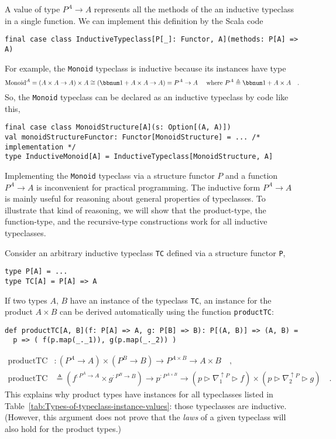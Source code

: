 A value of type $P^{A}\rightarrow A$ represents all the methods of
the an inductive typeclass in a single function. We can implement
this definition by the Scala code
\begin{lstlisting}
final case class InductiveTypeclass[P[_]: Functor, A](methods: P[A] => A)
\end{lstlisting}
For example, the \lstinline!Monoid! typeclass is inductive because
its instances have type 
\[
\text{Monoid}^{A}=\left(A\times A\rightarrow A\right)\times A\cong(\bbnum 1+A\times A\rightarrow A)=P^{A}\rightarrow A\quad\text{ where }P^{A}\triangleq\bbnum 1+A\times A\quad.
\]
So, the \lstinline!Monoid! typeclass can be declared as an inductive
typeclass by code like this,
\begin{lstlisting}
final case class MonoidStructure[A](s: Option[(A, A)])
val monoidStructureFunctor: Functor[MonoidStructure] = ... /* implementation */
type InductiveMonoid[A] = InductiveTypeclass[MonoidStructure, A]
\end{lstlisting}
Implementing the \lstinline!Monoid! typeclass via a structure functor
$P$ and a function $P^{A}\rightarrow A$ is inconvenient for practical
programming. The inductive form $P^{A}\rightarrow A$ is mainly useful
for reasoning about general properties of typeclasses. To illustrate
that kind of reasoning, we will show that the product-type, the function-type,
and the recursive-type constructions work for all inductive typeclasses. 

Consider an arbitrary inductive typeclass \lstinline!TC! defined
via a structure functor \lstinline!P!,
\begin{lstlisting}
type P[A] = ...
type TC[A] = P[A] => A
\end{lstlisting}
If two types $A$, $B$ have an instance of the typeclass \lstinline!TC!,
an instance for the product $A\times B$ can be derived automatically
using the function \lstinline!productTC!:
\begin{lstlisting}
def productTC[A, B](f: P[A] => A, g: P[B] => B): P[(A, B)] => (A, B) =
  p => ( f(p.map(_._1)), g(p.map(_._2)) )
\end{lstlisting}
\begin{align*}
\text{productTC} & :(P^{A}\rightarrow A)\times(P^{B}\rightarrow B)\rightarrow P^{A\times B}\rightarrow A\times B\quad,\\
\text{productTC} & \triangleq(f^{:P^{A}\rightarrow A}\times g^{:P^{B}\rightarrow B})\rightarrow p^{:P^{A\times B}}\rightarrow(p\triangleright\nabla_{1}^{\uparrow P}\triangleright f)\times(p\triangleright\nabla_{2}^{\uparrow P}\triangleright g)\quad.
\end{align*}
This explains why product types have instances for all typeclasses
listed in Table~\ref{tab:Types-of-typeclass-instance-values}: those
typeclasses are inductive. (However, this argument does not prove
that the \emph{laws} of a given typeclass will also hold for the product
types.)

